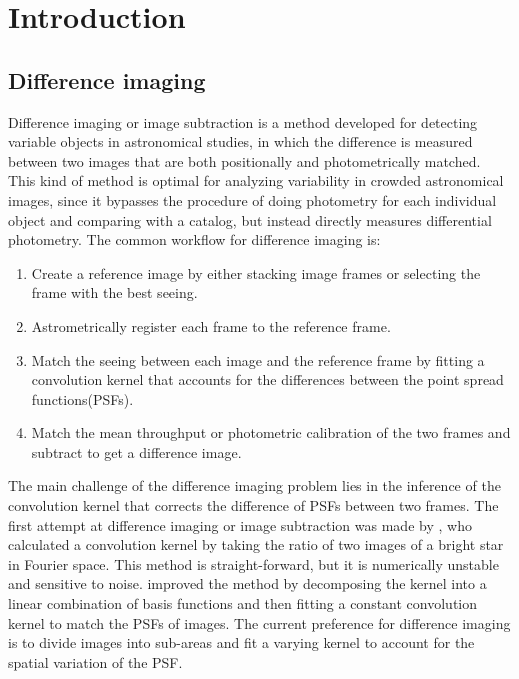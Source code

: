 \documentclass[12pt, preprint]{aastex}
\begin{document}

\section{Introduction}

\subsection{Difference imaging}
Difference imaging or image subtraction is a method developed for detecting variable objects in astronomical studies, in which the difference is measured between two images that are both positionally and photometrically matched. This kind of method is optimal for analyzing variability in crowded astronomical images, since it bypasses the procedure of doing photometry for each individual object and comparing with a catalog, but instead directly measures differential photometry.
The common workflow for difference imaging is:
\begin{enumerate}
\item
Create a reference image by either stacking image frames or selecting the frame with the best seeing.
\item
Astrometrically register each frame to the reference frame.
\item
Match the seeing between each image and the reference frame by fitting a convolution kernel that accounts for the differences between the point spread functions(PSFs).
\item
Match the mean throughput or photometric calibration of the two frames and subtract to get a difference image.
\end{enumerate}
The main challenge of the difference imaging problem lies in the inference of the convolution kernel that corrects the difference of PSFs between two frames.
The first attempt at difference imaging or image subtraction was made by \cite{imagesub1}, who calculated a convolution kernel by taking the ratio of two images of a bright star in Fourier space. 
This method is straight-forward, but it is numerically unstable and sensitive to noise.
\cite{alard} improved the method by decomposing the kernel into a linear combination of basis functions and then fitting a constant convolution kernel to match the PSFs of images.
The current preference for difference imaging \citep{varyingkernel} is to divide images into sub-areas and fit a varying kernel to account for the spatial variation of the PSF. 
\end{document}
